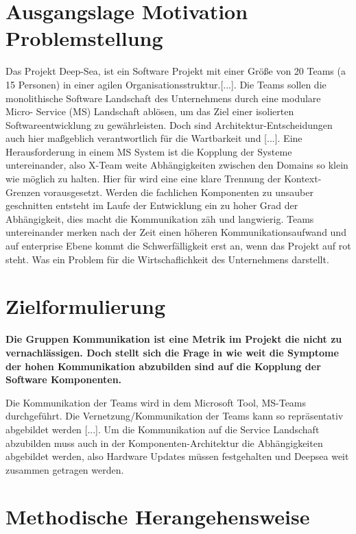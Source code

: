 \documentclass[12pt,reqno]{amsart}
\begin{document}
\section*{Ausgangslage Motivation Problemstellung}
Das Projekt Deep-Sea, ist ein Software Projekt mit einer Größe von 20 Teams (a 15 Personen) in einer agilen Organisationsstruktur.[...]. Die Teams sollen die monolithische Software Landschaft des Unternehmens durch eine modulare Micro- Service (MS) Landschaft ablösen, um das Ziel einer isolierten Softwareentwicklung zu gewährleisten. Doch sind Architektur-Entscheidungen auch hier maßgeblich verantwortlich für die Wartbarkeit und   [...].
Eine Herausforderung in einem MS System ist die Kopplung der Systeme untereinander, also X-Team weite Abhängigkeiten zwischen den Domains so klein wie möglich zu halten. Hier für wird eine eine klare Trennung der Kontext-Grenzen vorausgesetzt. Werden die fachlichen Komponenten zu unsauber geschnitten entsteht im Laufe der Entwicklung ein zu hoher Grad der Abhängigkeit, dies macht die Kommunikation zäh und langwierig. Teams untereinander merken nach der Zeit einen höheren Kommunikationsaufwand und auf enterprise Ebene kommt die Schwerfälligkeit erst an, wenn das Projekt auf rot steht. Was ein Problem für die Wirtschaflichkeit des Unternehmens darstellt.

\bigskip

\section*{Zielformulierung}

\bigskip
\textbf{Die Gruppen Kommunikation ist eine Metrik im Projekt die nicht zu vernachlässigen. Doch stellt sich die Frage in wie weit die Symptome der hohen Kommunikation abzubilden sind auf die Kopplung der Software Komponenten. }

\bigskip
Die Kommunikation der Teams wird in dem Microsoft Tool, MS-Teams durchgeführt.  Die  Vernetzung/Kommunikation der Teams kann so repräsentativ abgebildet werden  [...]. 
Um die Kommunikation auf die Service Landschaft abzubilden muss auch in der Komponenten-Architektur die Abhängigkeiten  abgebildet werden, also Hardware Updates müssen festgehalten und Deepsea weit zusammen getragen werden.


\bigskip

\section*{ Methodische Herangehensweise}
\end{document}
